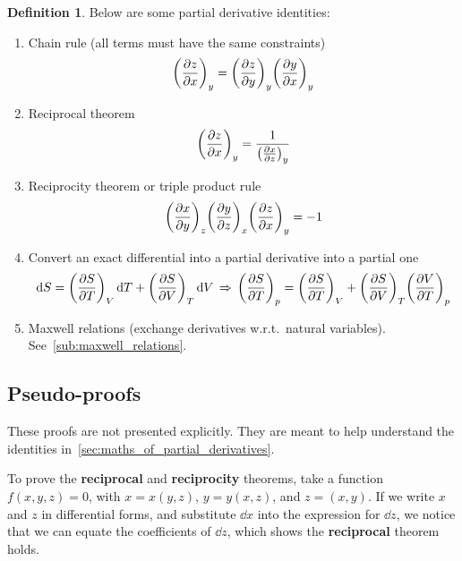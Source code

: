 \documentclass[12pt,chapterprefix=false,dvipsnames]{scrbook}
\theoremstyle{dotless}
\theoremstyle{definition}
\newtheorem{protodefinition}{Definition}[section]
\newenvironment{definition}
{\colorlet{shadecolor}{black!15}\begin{shaded}\begin{protodefinition}}
			{\end{protodefinition}\end{shaded}}
\begin{document}
\begin{definition}
	Below are some partial derivative identities:
	\begin{enumerate}
		\item Chain rule (all terms must have the same constraints)
		      \begin{equation}
			      {\left(\pdv{z}{x}\right)}_y ={\left(\pdv{z}{y}\right)}_y {\left(\pdv{y}{x}\right)}_y
		      \end{equation}
		\item Reciprocal theorem
		      \begin{equation}
			      {\left(\pdv{z}{x}\right)}_y = \frac{1}{{\left(\pdv{x}{z}\right)}_y}
		      \end{equation}
		\item Reciprocity theorem or triple product rule
		      \begin{equation}
			      {\left(\pdv{x}{y}\right)}_z	     {\left(\pdv{y}{z}\right)}_x
			      {\left(\pdv{z}{x}\right)}_y	      = -1
		      \end{equation}
		\item Convert an exact differential into a partial derivative into a
		      partial one
		      \begin{equation}
			      \dd{S} =
			      {\left(\pdv{S}{T}\right)}_V\dd{T} +
			      {\left(\pdv{S}{V}\right)}_T\dd{V}
			      \,\Rightarrow\,
			      {\left(\pdv{S}{T}\right)}_p
				      = {\left(\pdv{S}{T}\right)}_V +
			      {\left(\pdv{S}{V}\right)}_T
			      {\left(\pdv{V}{T}\right)}_p
		      \end{equation}
		\item Maxwell relations (exchange derivatives w.r.t.\ natural
		      variables). See~\ref{sub:maxwell_relations}.
	\end{enumerate}
\end{definition}

\subsection{Pseudo-proofs}%
\label{sub:pseudo_proofs}

These proofs are not presented explicitly. They are meant to
help understand the identities in~\ref{sec:maths_of_partial_derivatives}.

To prove the \textbf{reciprocal} and \textbf{reciprocity}
theorems, take a function $f(x,y,z) = 0$, with
$x = x(y,z)$, $y = y(x,z)$, and
$z = (x,y)$. If we write $x$ and
$z$ in differential forms, and substitute
$\dd{x}$ into the expression for
$\dd{z}$, we notice that we can equate the
coefficients of $\dd{z}$, which shows the
\textbf{reciprocal} theorem holds.
\end{document}
